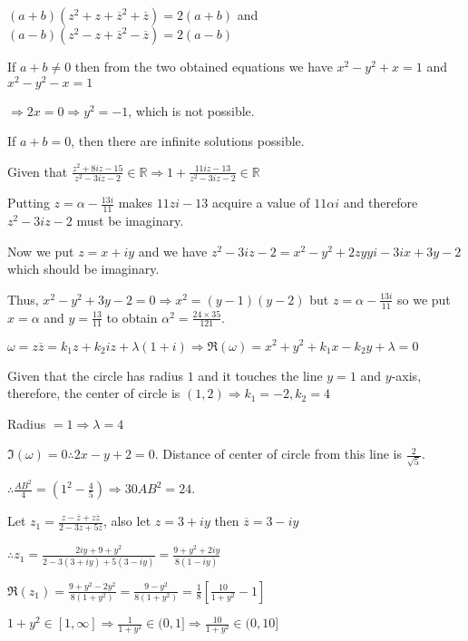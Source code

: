   $(a + b)(z^2 + z + \overline{z}^2 + \overline{z}) = 2(a + b)$ and $(a - b)(z^2 - z + \overline{z}^2
  - \overline{z}) = 2(a - b)$

  If $a + b \neq 0$ then from the two obtained equations we have $x^2 - y^2 + x = 1$ and $x^2 - y^2 - x = 1$

  $\Rightarrow 2x = 0\Rightarrow y^2 = -1$, which is not possible.

  If $a + b = 0$, then there are infinite solutions possible.
\item Given that $\frac{z^2 + 8iz - 15}{z^2 - 3iz - 2}\in\mathbb{R}\Rightarrow 1 + \frac{11iz - 13}{z^2 -
  3iz - 2}\in\mathbb{R}$

  Putting $z = \alpha - \frac{13i}{11}$ makes $11zi - 13$ acquire a value of $11\alpha i$ and therefore $z^2
  - 3iz -2$ must be imaginary.

  Now we put $z = x + iy$ and we have $z^2 - 3iz - 2 = x^2 - y^2 + 2zyyi - 3ix + 3y - 2$ which should be
  imaginary.

  Thus, $x^2 - y^2 + 3y - 2 = 0\Rightarrow x^2 = (y - 1)(y - 2)$ but $z = \alpha - \frac{13i}{11}$ so we put
  $x = \alpha$ and $y = \frac{13}{11}$ to obtain $\alpha^2 = \frac{24\times 35}{121}$.
\item $\omega = z\overline{z} = k_1z + k_2iz + \lambda(1 + i)\Rightarrow \Re(\omega) = x^2 + y^2 + k_1x -
  k_2y + \lambda = 0$

  Given that the circle has radius $1$ and it touches the line $y = 1$ and $y$-axis, therefore, the center
  of circle is $(1, 2) \Rightarrow k_1 = -2, k_2 = 4$

  Radius $=1\Rightarrow \lambda = 4$

  $\Im(\omega) = 0 \therefore 2x - y + 2 = 0$. Distance of center of circle from this line is
  $\frac{2}{\sqrt{5}}$.

  $\therefore \frac{AB^2}{4} = \left(1^2 - \frac{4}{5}\right)\Rightarrow 30AB^2 = 24$.
\item Let $z_1 = \frac{z - \overline{z} + z\overline{z}}{2 - 3z + 5\overline{z}}$, also let $z = 3 +
  iy$ then $\overline{z} = 3 - iy$

  $\therefore z_1 = \frac{2iy + 9 + y^2}{2 - 3(3 + iy) + 5(3 - iy)} = \frac{9 + y^2 + 2iy}{8(1 - iy)}$

  $\Re(z_1) = \frac{9 + y^2 - 2y^2}{8(1 + y^2)} = \frac{9 - y^2}{8(1 + y^2)} = \frac{1}{8}\left[\frac{10}{1
      + y^2} - 1\right]$

  $1 + y^2\in[1, \infty]\Rightarrow \frac{1}{1 + y^2}\in(0, 1]\Rightarrow \frac{10}{1 + y^2}\in(0, 10]$

